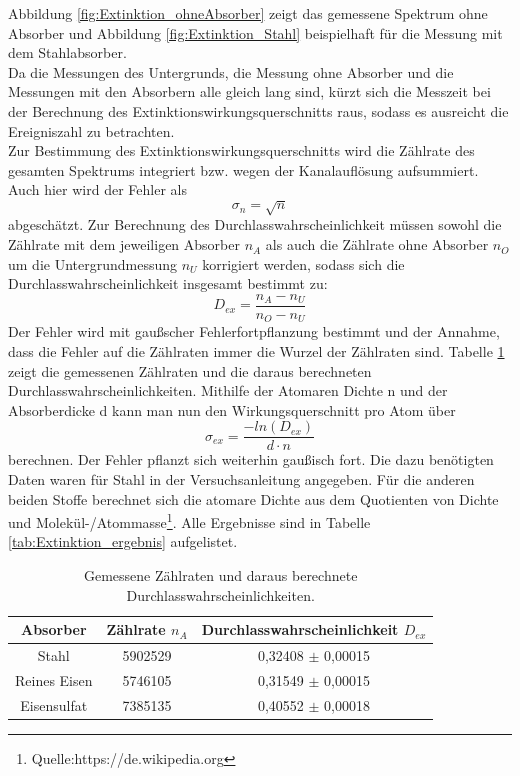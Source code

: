 \documentclass[12pt,a4paper]{article}
\begin{document}
Abbildung \ref{fig:Extinktion_ohneAbsorber} zeigt das gemessene Spektrum ohne Absorber und Abbildung \ref{fig:Extinktion_Stahl} beispielhaft für die Messung mit dem Stahlabsorber. \\
Da die Messungen des Untergrunds, die Messung ohne Absorber und die Messungen mit den Absorbern alle gleich lang sind, kürzt sich die Messzeit bei der Berechnung des Extinktionswirkungsquerschnitts raus, sodass es ausreicht die Ereigniszahl zu betrachten.\\ 
Zur Bestimmung des Extinktionswirkungsquerschnitts wird die Zählrate des gesamten Spektrums integriert bzw. wegen der Kanalauflösung aufsummiert. Auch hier wird der Fehler als 
\begin{equation*}
\sigma _{n} = \sqrt{n}
\end{equation*}
abgeschätzt. Zur Berechnung des Durchlasswahrscheinlichkeit müssen sowohl die Zählrate mit dem jeweiligen Absorber $n_A$ als auch die Zählrate ohne Absorber $n_O$ um die Untergrundmessung $n_U$ korrigiert werden, sodass sich die Durchlasswahrscheinlichkeit insgesamt bestimmt zu:
\begin{equation*}
D_{ex} = \dfrac{n_A - n_U}{n_O - n_U}
\end{equation*}
Der Fehler wird mit gaußscher Fehlerfortpflanzung bestimmt und der Annahme, dass die Fehler auf die Zählraten immer die Wurzel der Zählraten sind.
Tabelle \ref{tab:Extinktion_wirkungsquerschnitt} zeigt die gemessenen Zählraten und die daraus berechneten Durchlasswahrscheinlichkeiten. Mithilfe der Atomaren Dichte n und der Absorberdicke d kann man nun den Wirkungsquerschnitt pro Atom über \begin{equation}
\sigma_{ex} = \dfrac{-ln(D_{ex})}{d\cdot n}
\end{equation}
berechnen. Der Fehler pflanzt sich weiterhin gaußisch fort. Die dazu benötigten Daten waren für Stahl in der Versuchsanleitung angegeben. Für die anderen beiden Stoffe berechnet sich die atomare Dichte aus dem Quotienten von Dichte und Molekül-/Atommasse\footnote{Quelle:https://de.wikipedia.org}. Alle Ergebnisse sind in Tabelle \ref{tab:Extinktion_ergebnis} aufgelistet.\\

\begin{table}
\centering
\begin{tabular}{|c|c|c|}
\hline 
Absorber & Zählrate $n_A$ & Durchlasswahrscheinlichkeit $D_{ex}$ \\ 
\hline 
Stahl & 5902529 & 0,32408 $\pm$ 0,00015 \\
\hline 
Reines Eisen & 5746105 & 0,31549 $\pm$ 0,00015 \\
\hline
Eisensulfat & 7385135 & 0,40552 $\pm$ 0,00018 \\
\hline
\end{tabular} 
\caption{Gemessene Zählraten und daraus berechnete Durchlasswahrscheinlichkeiten.}
\label{tab:Extinktion_wirkungsquerschnitt}
\end{table}
\end{document}

